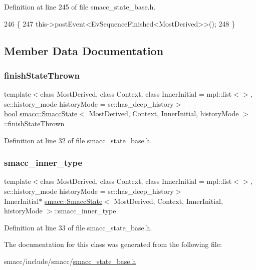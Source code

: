 Definition at line 245 of file smacc\+\_\+state\+\_\+base.\+h.


\begin{DoxyCode}
246   \{
247     this->postEvent<EvSequenceFinished<MostDerived>>();
248   \}
\end{DoxyCode}


\subsection{Member Data Documentation}
\mbox{\label{classsmacc_1_1SmaccState_a6c40f733c35ddfb9ae2a2f8e9bab07d3}} 
\subsubsection{\texorpdfstring{finish\+State\+Thrown}{finishStateThrown}}
{\footnotesize\ttfamily template$<$class Most\+Derived, class Context, class Inner\+Initial = mpl\+::list$<$$>$, sc\+::history\+\_\+mode history\+Mode = sc\+::has\+\_\+deep\+\_\+history$>$ \\
\hyperlink{classbool}{bool} \hyperlink{classsmacc_1_1SmaccState}{smacc\+::\+Smacc\+State}$<$ Most\+Derived, Context, Inner\+Initial, history\+Mode $>$\+::finish\+State\+Thrown}



Definition at line 32 of file smacc\+\_\+state\+\_\+base.\+h.

\mbox{\label{classsmacc_1_1SmaccState_a087d0f66729b98614feb8c59ea548af1}} 
\subsubsection{\texorpdfstring{smacc\+\_\+inner\+\_\+type}{smacc\_inner\_type}}
{\footnotesize\ttfamily template$<$class Most\+Derived, class Context, class Inner\+Initial = mpl\+::list$<$$>$, sc\+::history\+\_\+mode history\+Mode = sc\+::has\+\_\+deep\+\_\+history$>$ \\
Inner\+Initial$\ast$ \hyperlink{classsmacc_1_1SmaccState}{smacc\+::\+Smacc\+State}$<$ Most\+Derived, Context, Inner\+Initial, history\+Mode $>$\+::smacc\+\_\+inner\+\_\+type}



Definition at line 33 of file smacc\+\_\+state\+\_\+base.\+h.



The documentation for this class was generated from the following file\+:\begin{DoxyCompactItemize}
\item 
smacc/include/smacc/\hyperlink{smacc__state__base_8h}{smacc\+\_\+state\+\_\+base.\+h}\end{DoxyCompactItemize}
